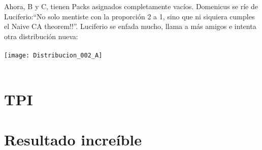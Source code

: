 	\noindent
	Ahora, B y C, tienen Packs asignados completamente vacíos. Domenicus se ríe de Luciferio:``No solo mentiste con la proporción 2 a 1, sino que ni siquiera cumples el Naive CA theorem!!''. Luciferio se enfada mucho, llama a más amigos e intenta otra distribución nueva:
	\\\\
	
	\noindent
	\texttt{[image: Distribucion\_002\_A]}
	\\\\
	
	\newpage
	
	
	
	
	
	
	
	\section{TPI}
	
	
	
	\section{Resultado increíble}